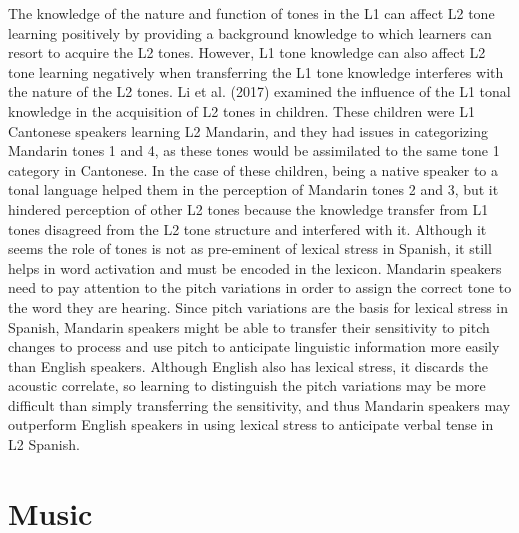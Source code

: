 \documentclass[english,man]{apa6}
\begin{document}
The knowledge of the nature and function of tones in the L1 can affect L2 tone learning positively by providing a background knowledge to which learners can resort to acquire the L2 tones. However, L1 tone knowledge can also affect L2 tone learning negatively when transferring the L1 tone knowledge interferes with the nature of the L2 tones. Li et al. (2017) examined the influence of the L1 tonal knowledge in the acquisition of L2 tones in children. These children were L1 Cantonese speakers learning L2 Mandarin, and they had issues in categorizing Mandarin tones 1 and 4, as these tones would be assimilated to the same tone 1 category in Cantonese. In the case of these children, being a native speaker to a tonal language helped them in the perception of Mandarin tones 2 and 3, but it hindered perception of other L2 tones because the knowledge transfer from L1 tones disagreed from the L2 tone structure and interfered with it.
Although it seems the role of tones is not as pre-eminent of lexical stress in Spanish, it still helps in word activation and must be encoded in the lexicon. Mandarin speakers need to pay attention to the pitch variations in order to assign the correct tone to the word they are hearing. Since pitch variations are the basis for lexical stress in Spanish, Mandarin speakers might be able to transfer their sensitivity to pitch changes to process and use pitch to anticipate linguistic information more easily than English speakers. Although English also has lexical stress, it discards the acoustic correlate, so learning to distinguish the pitch variations may be more difficult than simply transferring the sensitivity, and thus Mandarin speakers may outperform English speakers in using lexical stress to anticipate verbal tense in L2 Spanish.

\hypertarget{music}{%
\section{Music}\label{music}}
\end{document}
